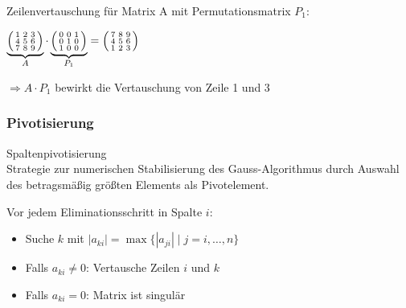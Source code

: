 \begin{example2}{Zeilenvertauschung} für Matrix A mit Permutationsmatrix $P_1$:
    \vspace{1mm}\\
\begin{minipage}[t]{0.5\textwidth}
    $\underbrace{\begin{psmallmatrix}
    1 & 2 & 3\\
    4 & 5 & 6\\
    7 & 8 & 9
    \end{psmallmatrix}}_{A} \cdot 
    \underbrace{\begin{psmallmatrix}
    0 & 0 & 1\\
    0 & 1 & 0\\
    1 & 0 & 0
    \end{psmallmatrix}}_{P_1} =
    \begin{psmallmatrix}
    7 & 8 & 9\\
    4 & 5 & 6\\
    1 & 2 & 3
    \end{psmallmatrix}$
\end{minipage}
\begin{minipage}[t]{0.45\textwidth}
    \vspace{-2mm}
    $\Rightarrow A \cdot P_1$ bewirkt die Vertauschung von Zeile 1 und 3
\end{minipage}
\end{example2}

\vspace{-1mm}
\subsubsection{Pivotisierung}

\begin{concept}{Spaltenpivotisierung}\\
Strategie zur numerischen Stabilisierung des Gauss-Algorithmus durch Auswahl des betragsmäßig größten Elements als Pivotelement.

Vor jedem Eliminationsschritt in Spalte $i$:
\begin{itemize}
    \item Suche $k$ mit $|a_{ki}| = \max\{|a_{ji}| \mid j = i,\ldots,n\}$
    \item Falls $a_{ki} \neq 0$: Vertausche Zeilen $i$ und $k$
    \item Falls $a_{ki} = 0$: Matrix ist singulär
\end{itemize}
\end{concept}

